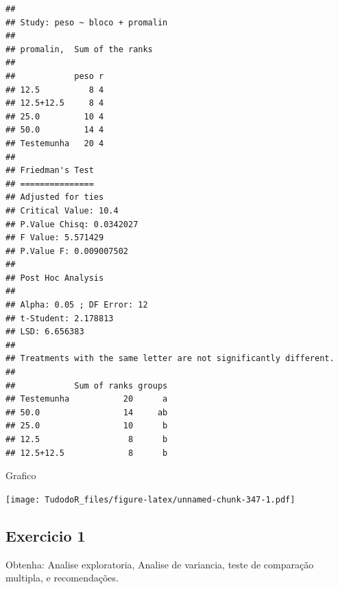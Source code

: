 \documentclass[
]{book}
\newenvironment{Shaded}{\begin{snugshade}}{\end{snugshade}}
\newcommand{\DataTypeTok}[1]{\textcolor[rgb]{0.13,0.29,0.53}{#1}}
\newcommand{\DecValTok}[1]{\textcolor[rgb]{0.00,0.00,0.81}{#1}}
\newcommand{\FloatTok}[1]{\textcolor[rgb]{0.00,0.00,0.81}{#1}}
\newcommand{\KeywordTok}[1]{\textcolor[rgb]{0.13,0.29,0.53}{\textbf{#1}}}
\newcommand{\NormalTok}[1]{#1}
\newcommand{\OperatorTok}[1]{\textcolor[rgb]{0.81,0.36,0.00}{\textbf{#1}}}
\newcommand{\OtherTok}[1]{\textcolor[rgb]{0.56,0.35,0.01}{#1}}
\newcommand{\StringTok}[1]{\textcolor[rgb]{0.31,0.60,0.02}{#1}}
\begin{document}
\begin{verbatim}
## 
## Study: peso ~ bloco + promalin 
## 
## promalin,  Sum of the ranks
## 
##            peso r
## 12.5          8 4
## 12.5+12.5     8 4
## 25.0         10 4
## 50.0         14 4
## Testemunha   20 4
## 
## Friedman's Test
## ===============
## Adjusted for ties
## Critical Value: 10.4
## P.Value Chisq: 0.0342027
## F Value: 5.571429
## P.Value F: 0.009007502 
## 
## Post Hoc Analysis
## 
## Alpha: 0.05 ; DF Error: 12
## t-Student: 2.178813
## LSD: 6.656383 
## 
## Treatments with the same letter are not significantly different.
## 
##            Sum of ranks groups
## Testemunha           20      a
## 50.0                 14     ab
## 25.0                 10      b
## 12.5                  8      b
## 12.5+12.5             8      b
\end{verbatim}

Grafico

\begin{Shaded}
\end{Shaded}

\texttt{[image: TudodoR\_files/figure-latex/unnamed-chunk-347-1.pdf]}

\hypertarget{exercicio-1}{%
\subsection{Exercicio 1}\label{exercicio-1}}

Obtenha: Analise exploratoria, Analise de variancia, teste de comparação multipla, e recomendações.
\end{document}
